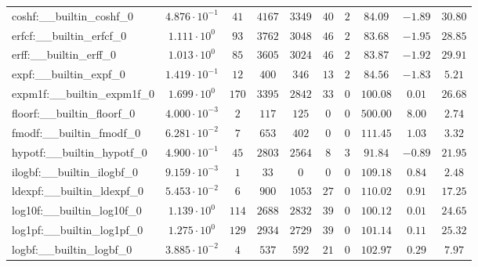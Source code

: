 \begin{tabular}{|l|c|c|c|c|c|c|c|c|c|}
coshf:\_\_builtin\_coshf\_0               & $ 4.876 \cdot 10^{-1} $ & $ 41     $ & $ 4167  $ & $ 3349  $ & $ 40  $ & $ 2  $ & $ 84.09       $ & $ -1.89   $ & $ 30.80   $ \\
erfcf:\_\_builtin\_erfcf\_0               & $ 1.111 \cdot 10^{0}  $ & $ 93     $ & $ 3762  $ & $ 3048  $ & $ 46  $ & $ 2  $ & $ 83.68       $ & $ -1.95   $ & $ 28.85   $ \\
erff:\_\_builtin\_erff\_0                 & $ 1.013 \cdot 10^{0}  $ & $ 85     $ & $ 3605  $ & $ 3024  $ & $ 46  $ & $ 2  $ & $ 83.87       $ & $ -1.92   $ & $ 29.91   $ \\
expf:\_\_builtin\_expf\_0                 & $ 1.419 \cdot 10^{-1} $ & $ 12     $ & $ 400   $ & $ 346   $ & $ 13  $ & $ 2  $ & $ 84.56       $ & $ -1.83   $ & $ 5.21    $ \\
expm1f:\_\_builtin\_expm1f\_0             & $ 1.699 \cdot 10^{0}  $ & $ 170    $ & $ 3395  $ & $ 2842  $ & $ 33  $ & $ 0  $ & $ 100.08      $ & $ 0.01    $ & $ 26.68   $ \\
floorf:\_\_builtin\_floorf\_0             & $ 4.000 \cdot 10^{-3} $ & $ 2      $ & $ 117   $ & $ 125   $ & $ 0   $ & $ 0  $ & $ 500.00      $ & $ 8.00    $ & $ 2.74    $ \\
fmodf:\_\_builtin\_fmodf\_0               & $ 6.281 \cdot 10^{-2} $ & $ 7      $ & $ 653   $ & $ 402   $ & $ 0   $ & $ 0  $ & $ 111.45      $ & $ 1.03    $ & $ 3.32    $ \\
hypotf:\_\_builtin\_hypotf\_0             & $ 4.900 \cdot 10^{-1} $ & $ 45     $ & $ 2803  $ & $ 2564  $ & $ 8   $ & $ 3  $ & $ 91.84       $ & $ -0.89   $ & $ 21.95   $ \\
ilogbf:\_\_builtin\_ilogbf\_0             & $ 9.159 \cdot 10^{-3} $ & $ 1      $ & $ 33    $ & $ 0     $ & $ 0   $ & $ 0  $ & $ 109.18      $ & $ 0.84    $ & $ 2.48    $ \\
ldexpf:\_\_builtin\_ldexpf\_0             & $ 5.453 \cdot 10^{-2} $ & $ 6      $ & $ 900   $ & $ 1053  $ & $ 27  $ & $ 0  $ & $ 110.02      $ & $ 0.91    $ & $ 17.25   $ \\
log10f:\_\_builtin\_log10f\_0             & $ 1.139 \cdot 10^{0}  $ & $ 114    $ & $ 2688  $ & $ 2832  $ & $ 39  $ & $ 0  $ & $ 100.12      $ & $ 0.01    $ & $ 24.65   $ \\
log1pf:\_\_builtin\_log1pf\_0             & $ 1.275 \cdot 10^{0}  $ & $ 129    $ & $ 2934  $ & $ 2729  $ & $ 39  $ & $ 0  $ & $ 101.14      $ & $ 0.11    $ & $ 25.32   $ \\
logbf:\_\_builtin\_logbf\_0               & $ 3.885 \cdot 10^{-2} $ & $ 4      $ & $ 537   $ & $ 592   $ & $ 21  $ & $ 0  $ & $ 102.97      $ & $ 0.29    $ & $ 7.97    $ \\

\end{tabular}
